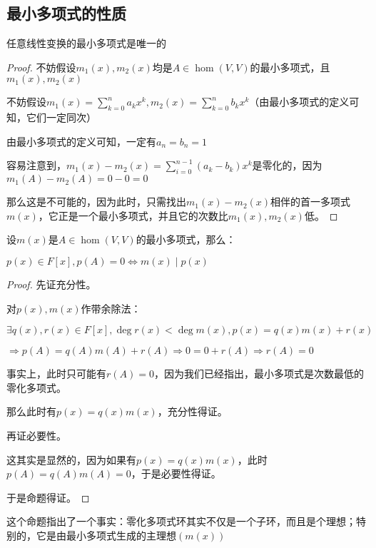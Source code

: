 \documentclass[12pt, a4paper, oneside, UTF8]{ctexbook}
\begin{document}
		\subsection{最小多项式的性质}
			\begin{para}{0}
					\begin{proposition}
						任意线性变换的最小多项式是唯一的
					\end{proposition}
					\begin{proof}
						不妨假设$m_1(x),m_2(x)$均是$A \in \hom(V,V)$的最小多项式，且$m_1(x),m_2(x)$

						不妨假设$m_1(x)=\sum\limits_{k=0}^{n} a_k x^k,m_2(x)=\sum\limits_{k=0}^{n} b_k x^k$（由最小多项式的定义可知，它们一定同次）

						由最小多项式的定义可知，一定有$a_n=b_n=1$

						容易注意到，$m_1(x)-m_2(x)=\sum\limits_{i=0}^{n-1} (a_k-b_k)x^k$是零化的，因为$m_1(A)-m_2(A)=0-0=0$

						那么这是不可能的，因为此时，只需找出$m_1(x)-m_2(x)$相伴的首一多项式$m(x)$，它正是一个最小多项式，并且它的次数比$m_1(x),m_2(x)$低。
					\end{proof}
				\point{}
					\begin{proposition}
						设$m(x)$是$A \in \hom(V,V)$的最小多项式，那么：

						$p(x) \in F[x],p(A)=0 \Leftrightarrow m(x) \mid p(x)$
					\end{proposition}
					\begin{proof}
						先证充分性。

						对$p(x),m(x)$作带余除法：

						$\exists q(x),r(x) \in F[x],\operatorname{deg}r(x) < \operatorname{deg} m(x),p(x)=q(x)m(x)+r(x)$

						$\Rightarrow p(A)=q(A)m(A)+r(A) \Rightarrow 0=0+r(A) \Rightarrow r(A)=0$

						事实上，此时只可能有$r(A)=0$，因为我们已经指出，最小多项式是次数最低的零化多项式。

						那么此时有$p(x)=q(x)m(x)$，充分性得证。

						再证必要性。

						这其实是显然的，因为如果有$p(x)=q(x)m(x)$，此时$p(A)=q(A)m(A)=0$，于是必要性得证。

						于是命题得证。
					\end{proof}
					这个命题指出了一个事实：零化多项式环其实不仅是一个子环，而且是个理想；特别的，它是由最小多项式生成的主理想$(m(x))$
				\point{}


\end{para}
\end{document}
